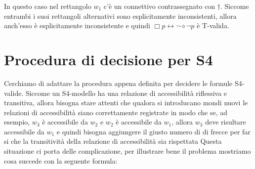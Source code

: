 \documentclass[a4paper, titlepage, 12pt]{report}
\begin{document}

In questo caso nel rettangolo $w_1$ c'è un connettivo contrassegnato con $\dagger$.
Siccome entrambi i suoi rettangoli alternativi sono esplicitamente inconsistenti,
allora anch'esso è esplicitamente inconsistente
e quindi $\Box p \leftrightarrow \neg \diamond \neg p$
è T-valida.

\section{Procedura di decisione per S4}
Cerchiamo di adattare la procedura appena definita per decidere le formule S4-valide.
Siccome un S4-modello ha una relazione di accessibilità riflessiva e transitiva, allora bisogna stare
attenti che qualora si introducano mondi nuovi le relazioni di accessibilità siano
correttamente registrate in modo che se, ad esempio, $w_3$ è accessibile da $w_2$ e $w_2$ è accessibile
da $w_1$, allora $w_3$ deve risultare accessibile da $w_1$ e quindi bisogna aggiungere il giusto
numero di di frecce per far si che la transitività della relazione di accessibilità sia rispettata
Questa situazione ci porta delle complicazione, per illustrare bene il problema
mostriamo cosa succede con la seguente formula:
\end{document}
